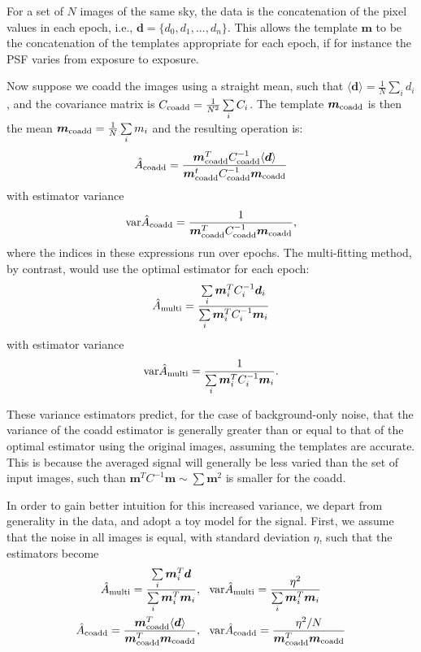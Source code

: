 \documentclass[fleqn,useAMS,usenatbib]{mnras}
\newcommand{\coadd}{{\rm coadd}}
\begin{document}
For a set of $N$ images of the same sky, the data is the concatenation of the
pixel values in each epoch, i.e., $\boldsymbol{d} = \{d_0, d_1, ..., d_n \}$.
This allows the template $\boldsymbol{m}$ to be the concatenation of the
templates appropriate for each epoch, if for instance the PSF varies from
exposure to exposure.

Now suppose we coadd the images using a straight mean, such that $\langle
\boldsymbol{d} \rangle = \frac{1}{N}\sum\limits_i d_i$, and the covariance
matrix is $C_\coadd = \frac{1}{N^2}\sum\limits_i C_i$.  The template
$\boldsymbol{m}_\coadd$ is then the mean $\boldsymbol{m}_\coadd = \frac{1}{N}\sum\limits_i m_i$
and the resulting operation is:
\begin{align}
    \hat{A}_\coadd = \frac{\boldsymbol{m}_\coadd^T C_\coadd^{-1} \langle \boldsymbol{d} \rangle}{\boldsymbol{m}_\coadd^t C_\coadd^{-1}\boldsymbol{m}_\coadd} 
\end{align}
with estimator variance
\begin{align} \label{eq:exact_var_coadd}
{\rm var}\hat{A}_\coadd = \frac{1}{\boldsymbol{m}_\coadd^T C_\coadd^{-1}\boldsymbol{m}_\coadd},
\end{align}
where the indices in these expressions run over epochs. The multi-fitting
method, by contrast, would use the optimal estimator for each epoch:
\begin{align}
\hat{A}_{\rm multi} = \frac{\sum\limits_i \boldsymbol{m}_i^T C_i^{-1}\boldsymbol{d}_i}{\sum\limits_i \boldsymbol{m}_i^T C_i^{-1}\boldsymbol{m}_i}
\end{align}
with estimator variance
\begin{align}
\label{eq:exact_var_multi}
{\rm var}\hat{A}_{\rm multi} = \frac{1}{\sum\limits_i \boldsymbol{m}_i^T C_i^{-1}\boldsymbol{m}_i}.
\end{align}

These variance estimators predict, for the case of background-only noise, that the
variance of the coadd estimator is generally greater than or equal to that of
the optimal estimator using the original images, assuming the templates are
accurate.  This is because the averaged signal will generally be less varied
than the set of input images, such than $\boldsymbol{m}^T C^{-1} \boldsymbol{m}
\sim \sum \boldsymbol{m}^2$ is smaller for the coadd.

In order to gain better intuition for this increased variance, we depart from
generality in the data, and adopt a toy model for the signal.  First, we assume
that the noise in all images is equal, with standard deviation $\eta$, such
that the estimators become
\begin{align}
    \hat{A}_{\rm multi} = \frac{\sum\limits_i \boldsymbol{m}_i^T \boldsymbol{d}}{\sum\limits_i \boldsymbol{m}_i^T \boldsymbol{m}_i}&, ~~
    {\rm var}\hat{A}_{\rm multi} = \frac{\eta^2}{\sum\limits_i \boldsymbol{m}_i^T \boldsymbol{m}_i}\\
    \hat{A}_\coadd = \frac{\boldsymbol{m}_\coadd^T \langle \boldsymbol{d} \rangle}{\boldsymbol{m}_\coadd^T \boldsymbol{m}_\coadd}&, ~~
    {\rm var}\hat{A}_\coadd = \frac{\eta^2/N}{\boldsymbol{m}_\coadd^T \boldsymbol{m}_\coadd}
\end{align}
\end{document}

